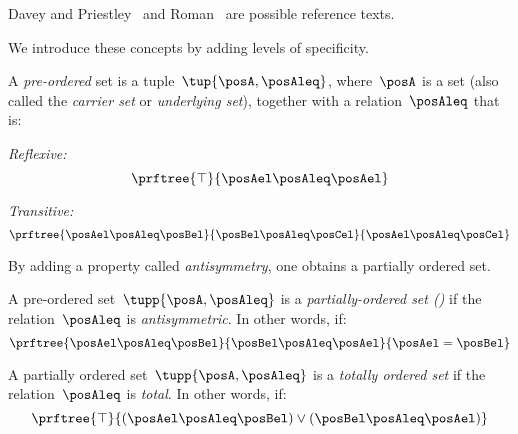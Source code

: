 Davey and Priestley~\cite{davey02}
and Roman~\cite{roman08} are possible reference texts.

We introduce these concepts by adding levels of specificity.

\begin{definition}
\label{def:preorder}
    A \emph{pre-ordered} set is a tuple~$\tup{\posA,\posAleq}$, where~$\posA$ is a set (also called the \emph{carrier set} or \emph{underlying set}), together with a relation~$\posAleq$ that is:
    \begin{compactitem}
        \item \emph{Reflexive:}
        \begin{equation}
            \prftree{\top}{\posAel \posAleq \posAel}
        \end{equation}
        \item \emph{Transitive:}
        \begin{equation}
            \prftree{\posAel \posAleq \posBel}{\posBel \posAleq \posCel}{\posAel \posAleq \posCel}
        \end{equation}
    \end{compactitem}
\end{definition}
By adding a property called \emph{antisymmetry}, one obtains a partially ordered set.
\begin{definition}
  \label{def:poset}
  A pre-ordered set~$\tupp{\posA,\posAleq}$ is a \emph{partially-ordered set ()} if the relation~$\posAleq$ is \emph{antisymmetric}. In other words, if:
      \begin{equation}
          \prftree{\posAel \posAleq \posBel}{\posBel \posAleq \posAel}{\posAel = \posBel}
    \end{equation}
\end{definition}

\begin{definition}
    \label{def:total_order}
    A partially ordered set~$\tupp{\posA,\posAleq}$ is a \emph{totally ordered set} if the relation~$\posAleq$ is \emph{total}. In other words, if:
    \begin{equation}
        \prftree{\top}{(\posAel \posAleq \posBel) \vee (\posBel \posAleq \posAel)}
    \end{equation}
\end{definition}

